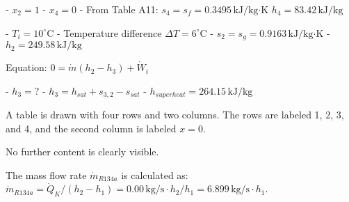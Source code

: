 - \( x_2 = 1 \)  
- \( x_4 = 0 \)  
- From Table A11:  
  \( s_4 = s_f = 0.3495 \, \text{kJ/kg·K} \)  
  \( h_4 = 83.42 \, \text{kJ/kg} \)  

- \( T_i = 10^\circ \text{C} \)  
- Temperature difference \( \Delta T = 6^\circ \text{C} \)  
- \( s_2 = s_g = 0.9163 \, \text{kJ/kg·K} \)  
- \( h_2 = 249.58 \, \text{kJ/kg} \)  

Equation:  
\( 0 = \dot{m} (h_2 - h_3) + \dot{W}_i \)  

- \( h_3 = ? \)  
- \( h_3 = h_{sat} + s_{3,2} - s_{sat} \)  
- \( h_{superheat} = 264.15 \, \text{kJ/kg} \)  

A table is drawn with four rows and two columns. The rows are labeled 1, 2, 3, and 4, and the second column is labeled \( x = 0 \).  

No further content is clearly visible.

The mass flow rate \( \dot{m}_{R134a} \) is calculated as:  
\( \dot{m}_{R134a} = \dot{Q}_K / (h_2 - h_1) = 0.00 \, \text{kg/s} \cdot h_2 / h_1 = 6.899 \, \text{kg/s} \cdot h_1 \).